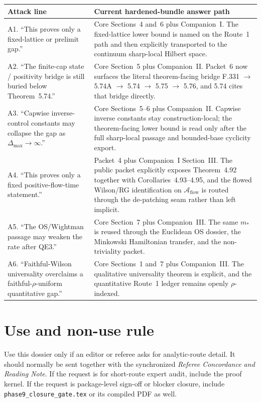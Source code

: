\documentclass[11pt]{article}
\begin{document}
\begin{center}
\small
\begin{tabularx}{\linewidth}{@{}L{4.0cm}Y@{}}
\toprule
\textbf{Attack line} & \textbf{Current hardened-bundle answer path}\\
\midrule
A1. ``This proves only a fixed-lattice or prelimit gap.'' & Core Sections~4 and~6 plus Companion~I. The fixed-lattice lower bound is named on the Route~1 path and then explicitly transported to the continuum sharp-local Hilbert space.\\
A2. ``The finite-cap state / positivity bridge is still buried below Theorem~5.74.'' & Core Section~5 plus Companion~II. Packet~6 now surfaces the literal theorem-facing bridge F.331 $\to$ 5.74A $\to$ 5.74 $\to$ 5.75 $\to$ 5.76, and 5.74 cites that bridge directly.\\
A3. ``Capwise inverse-control constants may collapse the gap as $\Delta_{\max}\to\infty$.'' & Core Sections~5--6 plus Companion~II. Capwise inverse constants stay construction-local; the theorem-facing lower bound is read only after the full sharp-local passage and bounded-base cyclicity export.\\
A4. ``This proves only a fixed positive-flow-time statement.'' & Packet~4 plus Companion~I Section~III. The public packet explicitly exposes Theorem~4.92 together with Corollaries~4.93--4.95, and the flowed Wilson/RG identification on $\mathcal A_{\mathrm{flow}}$ is routed through the de-patching seam rather than left implicit.\\
A5. ``The OS/Wightman passage may weaken the rate after QE3.'' & Core Section~7 plus Companion~III. The same $m_{\ast}$ is reused through the Euclidean OS dossier, the Minkowski Hamiltonian transfer, and the non-triviality packet.\\
A6. ``Faithful-Wilson universality overclaims a faithful-$\rho$-uniform quantitative gap.'' & Core Sections~1 and~7 plus Companion~III. The qualitative universality theorem is explicit, and the quantitative Route~1 ledger remains openly $\rho$-indexed.\\
\bottomrule
\end{tabularx}
\end{center}

\section{Use and non-use rule}

Use this dossier only if an editor or referee asks for analytic-route detail. It should normally be sent together with the synchronized \emph{Referee Concordance and Reading Note}. If the request is for short-route expert audit, include the proof kernel. If the request is package-level sign-off or blocker closure, include \texttt{phase9\_closure\_gate.tex} or its compiled PDF as well.
\end{document}
